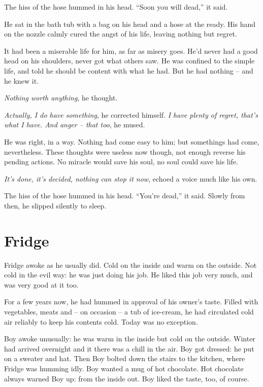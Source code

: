\documentclass[fontsize=12pt,english]{scrreprt}
\begin{document}
The hiss of the hose hummed in his head. ``Soon you will dead,'' it
said.

He sat in the bath tub with a bag on his head and a hose at the
ready. His hand on the nozzle calmly cured the angst of his life,
leaving nothing but regret.

It had been a miserable life for him, as far as misery goes. He'd
never had a good head on his shoulders, never got what others saw. He
was confined to the simple life, and told he should be content with
what he had. But he had nothing -- and he knew it.

\textit{Nothing worth anything}, he thought.

\textit{Actually, I do have something}, he corrected
himself. \textit{I have plenty of regret, that's what I have. And
  anger -- that too}, he mused.

He was right, in a way. Nothing had come easy to him; but somethings
had come, nevertheless. These thoughts were useless now though, not
enough reverse his pending actions. No miracle would save his soul, no
soul could save his life.

\textit{It's done, it's decided, nothing can stop it now}, echoed a
voice much like his own.

The hiss of the hose hummed in his head. ``You're dead,'' it
said. Slowly from then, he slipped silently to sleep.

\newpage

\section{Fridge}

Fridge awoke as he usually did. Cold on the inside and warm on the
outside. Not cold in the evil way: he was just doing his job. He liked
this job very much, and was very good at it too.

For a few years now, he had hummed in approval of his owner's
taste. Filled with vegetables, meats and -- on occasion -- a tub of
ice-cream, he had circulated cold air reliably to keep his contents
cold. Today was no exception.

Boy awoke unusually: he was warm in the inside but cold on the
outside. Winter had arrived overnight and it there was a chill in the
air. Boy got dressed: he put on a sweater and hat. Then Boy bolted
down the stairs to the kitchen, where Fridge was humming idly. Boy
wanted a mug of hot chocolate. Hot chocolate always warned Boy up:
from the inside out. Boy liked the taste, too, of course.
\end{document}
